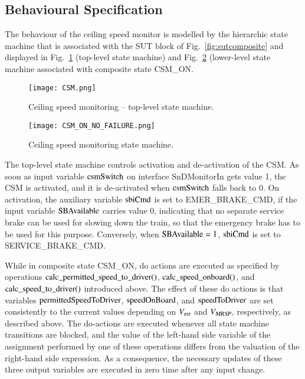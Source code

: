 \subsection{Behavioural Specification}
The behaviour of the ceiling speed monitor is modelled by the hierarchic state machine that is associated with the SUT block of Fig.~\ref{fig:sutcomposite} and displayed in Fig.~\ref{fig:csmsmtl} (top-level state machine) and Fig.~\ref{fig:csmsm} (lower-level state machine associated with composite state {\sf CSM\_ON}.


 \begin{figure}
 \centering
 \hspace*{-15mm}
\texttt{[image: CSM.png]}
\caption{Ceiling speed monitoring -- top-level state machine.}
 \label{fig:csmsmtl}
 \end{figure}
 
 
 \begin{figure}
 \centering
\hspace*{-15mm}
\texttt{[image: CSM\_ON\_NO\_FAILURE.png]}
\caption{Ceiling speed monitoring state machine.}
 \label{fig:csmsm}
 \end{figure}



The top-level state machine controls activation and de-activation of the CSM. As soon as input 
variable $\text{csmSwitch}$ on interface {\sf SnDMonitorIn} gets value 1, the CSM is activated, and it is de-activated when $\text{csmSwitch}$ falls back to 0. On activation, the auxiliary variable $\text{sbiCmd}$ is set to EMER\_BRAKE\_CMD, if the input variable $\text{SBAvailable}$ carries value 0, indicating that no separate service brake can be used for slowing down the train, so that the emergency brake has to be used for this purpose. Conversely, when $\text{SBAvailable} = 1$, $\text{sbiCmd}$ is set to SERVICE\_BRAKE\_CMD. 


While in composite state {\sf CSM\_ON}, do actions are
executed as specified by operations\newline
 $\text{calc\_permitted\_speed\_to\_driver()}$, $\text{calc\_speed\_onboard()}$, and   $\text{calc\_speed\_to\_driver()}$ 
introduced above. The effect of these
do actions is that variables $\text{permittedSpeedToDriver}$, $\text{speedOnBoard}$, and $\text{speedToDriver}$ 
 are set consistently to the current values depending on ${V_{\text{\sl est}}}$
and ${V_{\text{\sl MRSP}}}$, respectively, as described above. The do-actions are executed whenever all state machine transitions are blocked, and the value of the left-hand side variable of the assignment performed by one of these operations differs from the valuation of the right-hand side expression. As a consequence, the necessary updates of these three output variables are executed in zero time after any input change.

